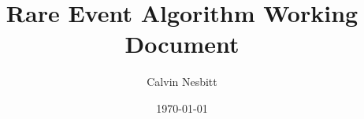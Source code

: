 \documentclass[11pt,a4,oneside]{article}
\title{Rare Event Algorithm Working Document}
\date{\today}
\author{Calvin Nesbitt}
\begin{document}
\maketitle


\tableofcontents
\newpage
{}


\newcommand{\patha}{tex}



\clearpage

 \newcommand{\bibLocation}{/Users/cfn18/Documents/PhD-Work/PhD-Latex-Repository/BibTex-Files} %
\end{document}
